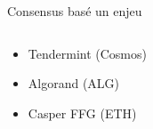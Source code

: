 \documentclass[presentation]{beamer}
\begin{document}
\begin{frame}[label={sec:org4604eb2}]{Consensus basé un enjeu}
\begin{columns}
\begin{column}{0.6\columnwidth}
\begin{block}
{\begin{figure}[htbp]
\end{figure}
}
\begin{itemize}
\item <2-> Tendermint (Cosmos)
\item <3-> Algorand (ALG)
\item <4> Casper FFG (ETH)
\end{itemize}
\end{block}
\end{column}
\end{columns}
\end{frame}
\end{document}
